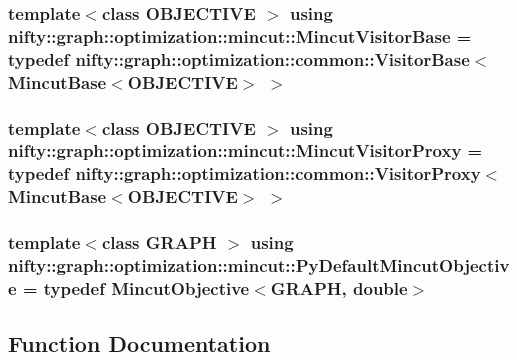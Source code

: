 \subsubsection[{Mincut\+Visitor\+Base}]{\setlength{\rightskip}{0pt plus 5cm}template$<$class O\+B\+J\+E\+C\+T\+I\+V\+E $>$ using {\bf nifty\+::graph\+::optimization\+::mincut\+::\+Mincut\+Visitor\+Base} = typedef {\bf nifty\+::graph\+::optimization\+::common\+::\+Visitor\+Base}$<$ {\bf Mincut\+Base}$<$O\+B\+J\+E\+C\+T\+I\+V\+E$>$ $>$}\label{namespacenifty_1_1graph_1_1optimization_1_1mincut_a95cebea00c03e9d82bf37342468c1fd9}
\hypertarget{namespacenifty_1_1graph_1_1optimization_1_1mincut_a6e8ff5bbfb5e0e5fcce56edb7420ebb3}{}
\subsubsection[{Mincut\+Visitor\+Proxy}]{\setlength{\rightskip}{0pt plus 5cm}template$<$class O\+B\+J\+E\+C\+T\+I\+V\+E $>$ using {\bf nifty\+::graph\+::optimization\+::mincut\+::\+Mincut\+Visitor\+Proxy} = typedef {\bf nifty\+::graph\+::optimization\+::common\+::\+Visitor\+Proxy}$<$ {\bf Mincut\+Base}$<$O\+B\+J\+E\+C\+T\+I\+V\+E$>$ $>$}\label{namespacenifty_1_1graph_1_1optimization_1_1mincut_a6e8ff5bbfb5e0e5fcce56edb7420ebb3}
\hypertarget{namespacenifty_1_1graph_1_1optimization_1_1mincut_a59ae7c3445ccd2a6626257d89b89cd9c}{}
\subsubsection[{Py\+Default\+Mincut\+Objective}]{\setlength{\rightskip}{0pt plus 5cm}template$<$class G\+R\+A\+P\+H $>$ using {\bf nifty\+::graph\+::optimization\+::mincut\+::\+Py\+Default\+Mincut\+Objective} = typedef {\bf Mincut\+Objective}$<$G\+R\+A\+P\+H, double$>$}\label{namespacenifty_1_1graph_1_1optimization_1_1mincut_a59ae7c3445ccd2a6626257d89b89cd9c}


\subsection{Function Documentation}
\hypertarget{namespacenifty_1_1graph_1_1optimization_1_1mincut_a04964bd5e4637ce88073ee84c12fa0c4}{}
